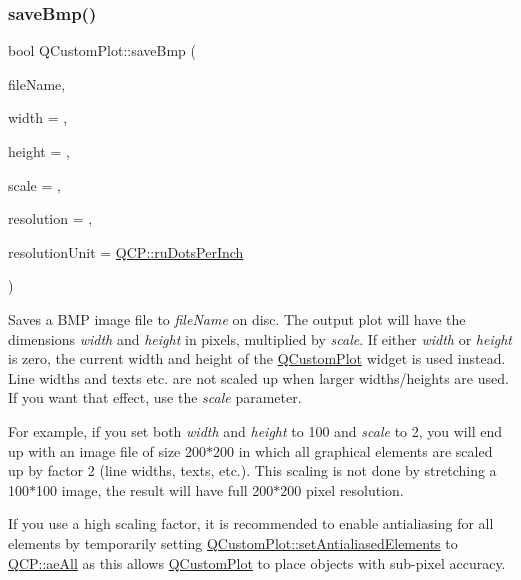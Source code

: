 \subsubsection{\texorpdfstring{saveBmp()}{saveBmp()}}
{\footnotesize\ttfamily bool Q\+Custom\+Plot\+::save\+Bmp (\begin{DoxyParamCaption}\item[{const Q\+String \&}]{file\+Name,  }\item[{int}]{width = {},  }\item[{int}]{height = {},  }\item[{double}]{scale = {},  }\item[{int}]{resolution = {},  }\item[{\mbox{\hyperlink{namespace_q_c_p_a715d46153da230990aa887d0f0602452}{Q\+C\+P\+::\+Resolution\+Unit}}}]{resolution\+Unit = {\ttfamily \mbox{\hyperlink{namespace_q_c_p_a715d46153da230990aa887d0f0602452affb887d8efe79c39a1aca2acd7002afc}{Q\+C\+P\+::ru\+Dots\+Per\+Inch}}} }\end{DoxyParamCaption})}

Saves a B\+MP image file to {\itshape file\+Name} on disc. The output plot will have the dimensions {\itshape width} and {\itshape height} in pixels, multiplied by {\itshape scale}. If either {\itshape width} or {\itshape height} is zero, the current width and height of the \mbox{\hyperlink{class_q_custom_plot}{Q\+Custom\+Plot}} widget is used instead. Line widths and texts etc. are not scaled up when larger widths/heights are used. If you want that effect, use the {\itshape scale} parameter.

For example, if you set both {\itshape width} and {\itshape height} to 100 and {\itshape scale} to 2, you will end up with an image file of size 200$\ast$200 in which all graphical elements are scaled up by factor 2 (line widths, texts, etc.). This scaling is not done by stretching a 100$\ast$100 image, the result will have full 200$\ast$200 pixel resolution.

If you use a high scaling factor, it is recommended to enable antialiasing for all elements by temporarily setting \mbox{\hyperlink{class_q_custom_plot_af6f91e5eab1be85f67c556e98c3745e8}{Q\+Custom\+Plot\+::set\+Antialiased\+Elements}} to \mbox{\hyperlink{namespace_q_c_p_ae55dbe315d41fe80f29ba88100843a0caa897c232a0ffc8368e7c100ffc59ef31}{Q\+C\+P\+::ae\+All}} as this allows \mbox{\hyperlink{class_q_custom_plot}{Q\+Custom\+Plot}} to place objects with sub-\/pixel accuracy.

